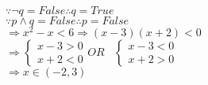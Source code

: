 
\immediate{}
\immediate{}
%
\begin{minipage}[b][14cm][t]{\textwidth}
\begin{center}\large{}\end{center}
\begin{large}
\\
\end{large}\\[5pt]
\begin{large}
\\
$\because \neg q=False \therefore q=True$\\
$\because p \wedge q = False \therefore p=False$ \\
$\Longrightarrow x^2 - x < 6 \Rightarrow (x-3)(x+2)<0$ \\
$\Longrightarrow \begin{cases} x-3>0 \\ x+2 < 0 \end{cases} OR \hspace{10pt} \begin{cases} x-3<0 \\ x+2>0\end{cases}$ \\
$\Longrightarrow x \in (-2,3)$
\end{large}
\end{minipage}
